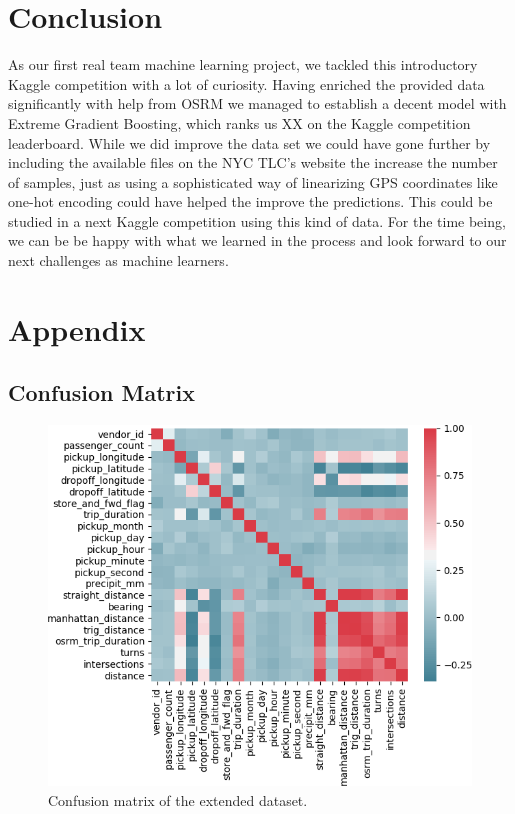 \documentclass[a4paper]{article}
\begin{document}
\section{Conclusion}
As our first real team machine learning project, we tackled this introductory
Kaggle competition with a lot of curiosity. Having enriched the provided data
significantly with help from OSRM we managed to establish a decent model with
Extreme Gradient Boosting, which ranks us XX on the Kaggle competition
leaderboard. While we did improve the data set we could have gone further by
including the available files on the NYC TLC’s website the increase the number
of samples, just as using a sophisticated way of linearizing GPS coordinates
like one-hot encoding could have helped the improve the predictions. This could
be studied in a next Kaggle competition using this kind of data. For the time
being, we can be be happy with what we learned in the process and look forward
to our next challenges as machine learners.

\newpage
\footnotesize



\appendix
\newpage
\section{Appendix}

\subsection{Confusion Matrix}
\begin{figure}[h!]
    \centering
    \includegraphics[width=0.8\linewidth]{confusion}
    \caption{Confusion matrix of the extended dataset.}
    \label{confusion}
\end{figure}
\end{document}
